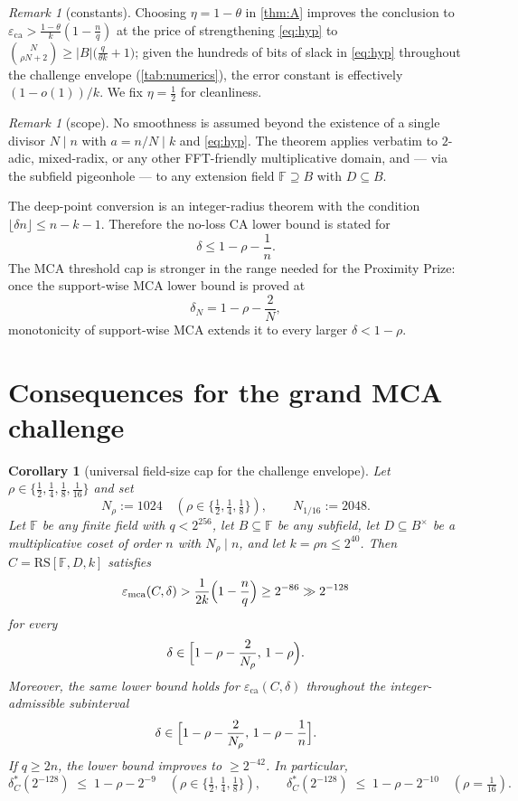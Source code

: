 \documentclass[11pt]{article}
\newtheorem{corollary}[theorem]{Corollary}
\theoremstyle{definition}
\theoremstyle{remark}
\newtheorem{remark}[theorem]{Remark}
\newcommand{\F}{\mathbb{F}}
\newcommand{\B}{B}
\newcommand{\RS}{\mathrm{RS}}
\newcommand{\eca}{\varepsilon_{\mathrm{ca}}}
\newcommand{\emca}{\varepsilon_{\mathrm{mca}}}
\begin{document}
\begin{remark}[constants]\label{rem:eta}
Choosing $\eta=1-\theta$ in \cref{thm:A} improves the conclusion to $\eca>\frac{1-\theta}k(1-\frac nq)$ at the price of strengthening \eqref{eq:hyp} to $\binom N{\rho N+2}\ge|\B|\bigl(\frac q{\theta k}+1\bigr)$; given the hundreds of bits of slack in \eqref{eq:hyp} throughout the challenge envelope (\cref{tab:numerics}), the error constant is effectively $(1-o(1))/k$. We fix $\eta=\frac12$ for cleanliness.
\end{remark}

\begin{remark}[scope]\label{rem:scope}
No smoothness is assumed beyond the existence of a single divisor $N\mid n$ with $a=n/N\mid k$ and \eqref{eq:hyp}. The theorem applies verbatim to $2$-adic, mixed-radix, or any other FFT-friendly multiplicative domain, and --- via the subfield pigeonhole --- to any extension field $\F\supseteq\B$ with $D\subseteq\B$.

The deep-point conversion is an integer-radius theorem with the condition $\lfloor\delta n\rfloor\le n-k-1$. Therefore the no-loss CA lower bound is stated for
\[
        \delta \le 1-\rho-\frac1n .
\]
The MCA threshold cap is stronger in the range needed for the Proximity Prize: once the support-wise MCA lower bound is proved at
\[
        \delta_N=1-\rho-\frac2N,
\]
monotonicity of support-wise MCA extends it to every larger $\delta<1-\rho$.
\end{remark}

\section{Consequences for the grand MCA challenge}\label{sec:grand}

\begin{corollary}[universal field-size cap for the challenge envelope]\label{cor:grand}
Let $\rho\in\{\frac12,\frac14,\frac18,\frac1{16}\}$ and set
\[
N_\rho:=1024\quad(\rho\in\{\tfrac12,\tfrac14,\tfrac18\}),\qquad N_{1/16}:=2048 .
\]
Let $\F$ be any finite field with $q<2^{256}$, let $\B\subseteq\F$ be any subfield, let $D\subseteq\B^\times$ be a multiplicative coset of order $n$ with $N_\rho\mid n$, and let $k=\rho n\le2^{40}$. Then $C=\RS[\F,D,k]$ satisfies
\[
\emca(C,\delta)
>
\frac1{2k}\Bigl(1-\frac nq\Bigr)
\ge
2^{-86}
\gg
2^{-128}
\]
for every
\[
        \delta\in
        \Bigl[1-\rho-\frac2{N_\rho},\,1-\rho\Bigr).
\]
Moreover, the same lower bound holds for $\eca(C,\delta)$ throughout the integer-admissible subinterval
\[
        \delta\in
        \Bigl[1-\rho-\frac2{N_\rho},\,1-\rho-\frac1n\Bigr].
\]
If $q\ge2n$, the lower bound improves to $\ge2^{-42}$. In particular,
\[
\delta^*_C(2^{-128})\;\le\;1-\rho-2^{-9}\quad(\rho\in\{\tfrac12,\tfrac14,\tfrac18\}),
\qquad
\delta^*_C(2^{-128})\;\le\;1-\rho-2^{-10}\quad(\rho=\tfrac1{16}).
\]
\end{corollary}
\end{document}
